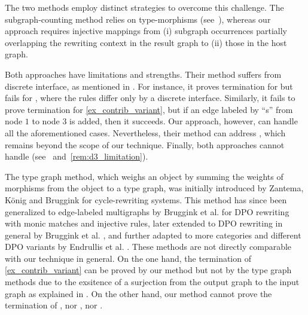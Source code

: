 The two methods employ distinct strategies to overcome this challenge. The subgraph-counting method relies on type-morphisms (see~\cite[p. 9, remark 4.11, Lemma 4.23]{overbeek2024termination_lmcs}), whereas our approach requires injective mappings from (i) subgraph occurrences partially overlapping the rewriting context in the result graph to (ii) those in the host graph.

  
Both approaches have limitations and strengths. Their method suffers from discrete interface, as mentioned in \cite[Example 5.5]{overbeek2024termination_lmcs}. For instance, it proves termination for \cite[Example 5.5]{overbeek2024termination_lmcs} but fails for \cite[Example 6.3]{endrullis2024generalized_arxiv_v2}, where the rules differ only by a discrete interface. 
Similarly, it fails to prove termination for \autoref{ex_contrib_variant}, but if an edge labeled by ``s'' from node $1$ to node $3$ is added, then it succeeds. Our approach, however, can handle all the aforementioned cases. Nevertheless, their method can address \cite[Example 4.1]{plump1995ontermination}, which remains beyond the scope of our technique. Finally, both approaches cannot handle \cite[Example D.3]{endrullis2024generalized_arxiv_v2} (see~\cite[Remark 6.2]{overbeek2024termination_lmcs} and~\autoref{rem:d3_limitation}).

The type graph method, which weighs an object by summing the weights of morphisms from the object to a type graph, was initially introduced by Zantema, K{\"o}nig and Bruggink \cite{zantema2014termination} for cycle-rewriting systems. 
This method has since been generalized to edge-labeled multigraphs by Bruggink et al. \cite{bruggink2014termination} for DPO rewriting with monic matches and injective rules, later extended to DPO rewriting in general by Bruggink et al. \cite{bruggink2015proving}, and further adapted to more categories and different DPO variants by Endrullis et al. \cite{endrullis2024generalized_arxiv_v2}. 
These methods are not directly comparable with our technique in general.
On the one hand, the termination of \autoref{ex_contrib_variant} can be proved by our method but not by the type graph methods due to the exsitence of a surjection from the output graph to the input graph as explained in \cite[Example D.4]{endrullis2024generalized_arxiv_v2}. On the other hand, our method cannot prove the termination of \cite[Example 1, 5 and Ad-hoc Routing Protocol]{bruggink2014termination}, nor \cite[Example 5, 6]{bruggink2015proving}, nor \cite[Examples D2 and D3]{endrullis2024generalized_arxiv_v2}.

